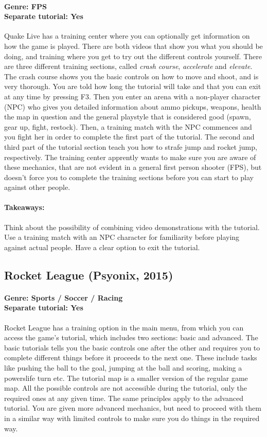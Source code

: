 \paragraph{Genre: FPS \\ Separate tutorial: Yes \\}
Quake Live has a training center where you can optionally get information on how the game is played. There are both videos that show you what you should be doing, and training where you get to try out the different controls yourself. There are three different training sections, called \textit{crash course}, \textit{accelerate} and \textit{elevate}. The crash course shows you the basic controls on how to move and shoot, and is very thorough. You are told how long the tutorial will take and that you can exit at any time by pressing F3. Then you enter an arena with a non-player character (NPC) who gives you detailed information about ammo pickups, weapons, health the map in question and the general playstyle that is considered good (spawn, gear up, fight, restock). Then, a training match with the NPC commences and you fight her in order to complete the first part of the tutorial. The second and third part of the tutorial section teach you how to strafe jump and rocket jump, respectively. The training center apprently wants to make sure you are aware of these mechanics, that are not evident in a general first person shooter (FPS), but doesn't force you to complete the training sections before you can start to play against other people.
\paragraph{Takeaways:}
Think about the possibility of combining video demonstrations with the tutorial.
Use a training match with an NPC character for familiarity before playing against actual people. Have a clear option to exit the tutorial.

\subsection{Rocket League (Psyonix, 2015)}
\paragraph{Genre: Sports / Soccer / Racing \\ Separate tutorial: Yes \\}
Rocket League has a training option in the main menu, from which you can access the game's tutorial, which includes two sections: basic and advanced.
The basic tutorials tells you the basic controls one after the other and requires you to complete different things before it proceeds to the next one. These include tasks like pushing the ball to the goal, jumping at the ball and scoring, making a powerslife turn etc. The tutorial map is a smaller version of the regular game map. All the possible controls are not accessible during the tutorial, only the required ones at any given time.
The same principles apply to the advanced tutorial. You are given more advanced mechanics, but need to proceed with them in a similar way with limited controls to make sure you do things in the required way.
